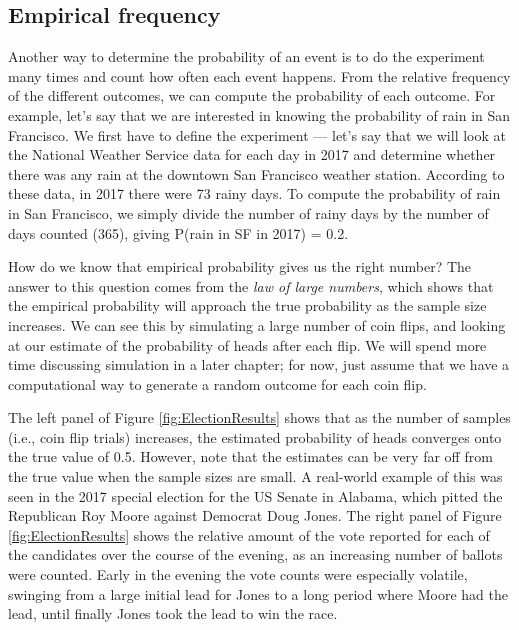 \documentclass[
  12pt,
]{book}
\begin{document}
\hypertarget{empirical-frequency}{%
\subsection{Empirical frequency}\label{empirical-frequency}}

Another way to determine the probability of an event is to do the experiment many times and count how often each event happens. From the relative frequency of the different outcomes, we can compute the probability of each outcome. For example, let's say that we are interested in knowing the probability of rain in San Francisco. We first have to define the experiment --- let's say that we will look at the National Weather Service data for each day in 2017 and determine whether there was any rain at the downtown San Francisco weather station. According to these data, in 2017 there were 73 rainy days. To compute the probability of rain in San Francisco, we simply divide the number of rainy days by the number of days counted (365), giving P(rain in SF in 2017) = 0.2.

How do we know that empirical probability gives us the right number? The answer to this question comes from the \emph{law of large numbers}, which shows that the empirical probability will approach the true probability as the sample size increases. We can see this by simulating a large number of coin flips, and looking at our estimate of the probability of heads after each flip. We will spend more time discussing simulation in a later chapter; for now, just assume that we have a computational way to generate a random outcome for each coin flip.

The left panel of Figure \ref{fig:ElectionResults} shows that as the number of samples (i.e., coin flip trials) increases, the estimated probability of heads converges onto the true value of 0.5. However, note that the estimates can be very far off from the true value when the sample sizes are small. A real-world example of this was seen in the 2017 special election for the US Senate in Alabama, which pitted the Republican Roy Moore against Democrat Doug Jones. The right panel of Figure \ref{fig:ElectionResults} shows the relative amount of the vote reported for each of the candidates over the course of the evening, as an increasing number of ballots were counted. Early in the evening the vote counts were especially volatile, swinging from a large initial lead for Jones to a long period where Moore had the lead, until finally Jones took the lead to win the race.
\end{document}
